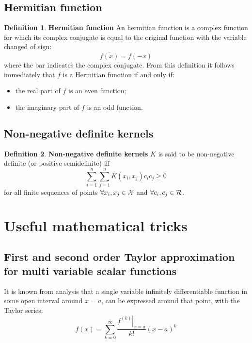 \documentclass[12pt, letterpaper]{article}
\theoremstyle{definition}
\newtheorem{definition}{Definition}[section]
\let\tb\textbf
\begin{document}
\subsection{Hermitian function}
\label{Hermitian}
\begin{definition}{\tb{Hermitian function}}
An hermitian function is a complex function for which its complex conjugate is equal to the original function with the variable changed of sign:
\begin{equation}
\bar{f(x)} = f(-x)
\end{equation}
where the bar indicates the complex conjugate.
From this definition it follows immediately that $f$ is a Hermitian function if and only if:
\begin{itemize}
\item the real part of $f$ is an even function;
\item the imaginary part of $f$ is an odd function.
\end{itemize}
\end{definition}

\subsection{Non-negative definite kernels}
\begin{definition}{\tb{Non-negative definite kernels}}
$K$ is said to be non-negative definite (or positive semidefinite) iff
\begin{equation}
\sum _{i=1}^{n}\sum _{j=1}^{n}K(x_{i},x_{j})c_{i}c_{j}\geq 0
\end{equation}
for all finite sequences of points $\forall x_i,x_j \in \CMcal{X}$ and $\forall c_i, c_j \in \CMcal{R}$.
\end{definition}

\newpage
\section{Useful mathematical tricks}
\subsection{First and second order Taylor approximation for multi variable scalar functions}
\label{subsec:Taylor}
It is known from analysis that a single variable  infinitely differentiable function in some open interval around $x=a$, can be expressed around that point, with the Taylor series:
\begin{equation}
f(x) = \displaystyle \sum_{k=0}^\infty \frac{\left. f^{(k)}\right|_{x=a} }{k!} (x-a)^k
\end{equation}
\end{document}
